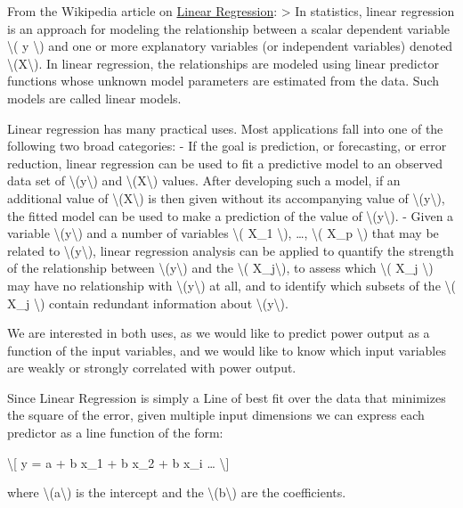 \documentclass[11pt]{article}
\begin{document}
    From the Wikipedia article on
\href{https://en.wikipedia.org/wiki/Linear_regression}{Linear
Regression}: \textgreater{} In statistics, linear regression is an
approach for modeling the relationship between a scalar dependent
variable \textbackslash( y \textbackslash) and one or more explanatory
variables (or independent variables) denoted
\textbackslash(X\textbackslash). In linear regression, the relationships
are modeled using linear predictor functions whose unknown model
parameters are estimated from the data. Such models are called linear
models.

Linear regression has many practical uses. Most applications fall into
one of the following two broad categories: - If the goal is prediction,
or forecasting, or error reduction, linear regression can be used to fit
a predictive model to an observed data set of
\textbackslash(y\textbackslash) and \textbackslash(X\textbackslash)
values. After developing such a model, if an additional value of
\textbackslash(X\textbackslash) is then given without its accompanying
value of \textbackslash(y\textbackslash), the fitted model can be used
to make a prediction of the value of \textbackslash(y\textbackslash). -
Given a variable \textbackslash(y\textbackslash) and a number of
variables \textbackslash( X\_1 \textbackslash), \ldots, \textbackslash(
X\_p \textbackslash) that may be related to
\textbackslash(y\textbackslash), linear regression analysis can be
applied to quantify the strength of the relationship between
\textbackslash(y\textbackslash) and the \textbackslash(
X\_j\textbackslash), to assess which \textbackslash( X\_j
\textbackslash) may have no relationship with
\textbackslash(y\textbackslash) at all, and to identify which subsets of
the \textbackslash( X\_j \textbackslash) contain redundant information
about \textbackslash(y\textbackslash).

We are interested in both uses, as we would like to predict power output
as a function of the input variables, and we would like to know which
input variables are weakly or strongly correlated with power output.

Since Linear Regression is simply a Line of best fit over the data that
minimizes the square of the error, given multiple input dimensions we
can express each predictor as a line function of the form:

\textbackslash{[} y = a + b x\_1 + b x\_2 + b x\_i \ldots{}
\textbackslash{]}

where \textbackslash(a\textbackslash) is the intercept and the
\textbackslash(b\textbackslash) are the coefficients.
\end{document}
